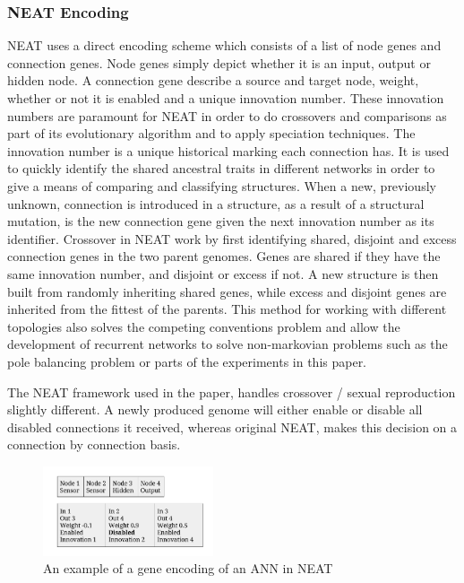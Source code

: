 \subsubsection{NEAT Encoding}
NEAT uses a direct encoding scheme which consists of a list of node genes and connection genes. Node genes simply depict whether it is an input, output or hidden node. A connection gene describe a source and target node, weight, whether or not it is enabled and a unique innovation number.
These innovation numbers are paramount for NEAT in order to do crossovers and comparisons as part of its evolutionary algorithm and to apply speciation techniques. The innovation number is a unique historical marking each connection has. It is used to quickly identify the shared ancestral traits in different networks in order to give a means of comparing and classifying structures. When a new, previously unknown, connection is introduced in a structure, as a result of a structural mutation, is the new connection gene given the next innovation number as its identifier.
Crossover in NEAT work by first identifying shared, disjoint and excess connection genes in the two parent genomes. Genes are shared if they have the same innovation number, and disjoint or excess if not. A new structure is then built from randomly inheriting shared genes, while excess and disjoint genes are inherited from the fittest of the parents. This method for working with different topologies also solves the competing conventions problem and allow the development of recurrent networks to solve non-markovian problems such as the pole balancing problem or parts of the experiments in this paper.

The NEAT framework used in the paper, handles crossover / sexual reproduction slightly different. A newly produced genome will either enable or disable all disabled connections it received, whereas original NEAT, makes this decision on a connection by connection basis.

\begin{figure}[H]
	\centering
	\includegraphics[width=190px]{img/genotype.png}
	\caption[NEAT gene encoding]{An example of a gene encoding of an ANN in NEAT}
	\label{fig:genotype}
\end{figure}

